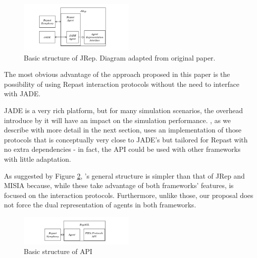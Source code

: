 \begin{figure}[h]
	\centering
	\includegraphics[width=0.5\textwidth]{figures/jrep.png}
	\caption{Basic structure of JRep. Diagram
		adapted from original paper. \cite{garcia2011misia}}
	\label{fig:jrep}
\end{figure}

The most obvious advantage of the approach proposed in this paper is the possibility of using Repast interaction protocols without the need to interface with JADE.

JADE is a very rich platform, but for many simulation scenarios, the overhead introduce by it will have an impact on the simulation performance. \cite{mengistu2008scalability} \apiname{}, as we describe with more detail in the next section, uses an implementation of those protocols that is conceptually very close to JADE's but tailored for Repast with no extra dependencies - in fact, the API could be used with other frameworks with little adaptation.

As suggested by Figure \ref{fig:related-repacl}, \apiname{}'s general structure is simpler than that of JRep and MISIA because, while these take advantage of both frameworks' features, \apiname{} is focused on the interaction protocols. Furthermore, unlike those, our proposal does not force the dual representation of agents in both frameworks.

\begin{figure}[h]
	\centering
	\includegraphics[width=0.5\textwidth]{figures/repacl.png}
	\caption{Basic structure of \apiname{} API}
	\label{fig:related-repacl}
\end{figure}
